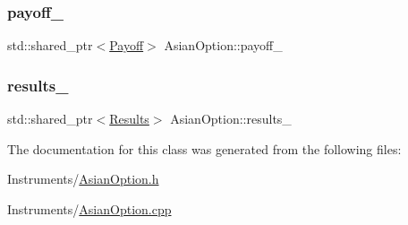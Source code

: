 \subsubsection{\texorpdfstring{payoff\+\_\+}{payoff\_}}
{\footnotesize\ttfamily std\+::shared\+\_\+ptr$<$\hyperlink{class_payoff}{Payoff}$>$ Asian\+Option\+::payoff\+\_\+\hspace{0.3cm}{\ttfamily [private]}}

\hypertarget{class_asian_option_aea29a8aff78cbe4101b4f060cedb6307}{}\label{class_asian_option_aea29a8aff78cbe4101b4f060cedb6307} 
\subsubsection{\texorpdfstring{results\+\_\+}{results\_}}
{\footnotesize\ttfamily std\+::shared\+\_\+ptr$<$\hyperlink{class_asian_option_1_1_results}{Results}$>$ Asian\+Option\+::results\+\_\+\hspace{0.3cm}{\ttfamily [private]}}



The documentation for this class was generated from the following files\+:\begin{DoxyCompactItemize}
\item 
Instruments/\hyperlink{_asian_option_8h}{Asian\+Option.\+h}\item 
Instruments/\hyperlink{_asian_option_8cpp}{Asian\+Option.\+cpp}\end{DoxyCompactItemize}
